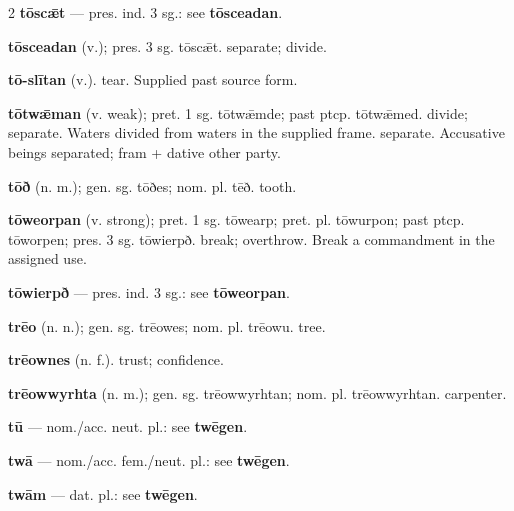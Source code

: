 \begin{multicols*}{2}
\textbf{tōscǣt} — pres. ind. 3 sg.: see \textbf{tōsceadan}.\par
\textbf{tōsceadan} (v.); pres. 3 sg. tōscǣt. separate; divide.\par
\textbf{tō-slītan} (v.). tear. Supplied past source form.\par
\textbf{tōtwǣman} (v. weak); pret. 1 sg. tōtwǣmde; past ptcp. tōtwǣmed. divide; separate. Waters divided from waters in the supplied frame. separate. Accusative beings separated; fram + dative other party.\par
\textbf{tōð} (n. m.); gen. sg. tōðes; nom. pl. tēð. tooth.\par
\textbf{tōweorpan} (v. strong); pret. 1 sg. tōwearp; pret. pl. tōwurpon; past ptcp. tōworpen; pres. 3 sg. tōwierpð. break; overthrow. Break a commandment in the assigned use.\par
\textbf{tōwierpð} — pres. ind. 3 sg.: see \textbf{tōweorpan}.\par
\textbf{trēo} (n. n.); gen. sg. trēowes; nom. pl. trēowu. tree.\par
\textbf{trēownes} (n. f.). trust; confidence.\par
\textbf{trēowwyrhta} (n. m.); gen. sg. trēowwyrhtan; nom. pl. trēowwyrhtan. carpenter.\par
\textbf{tū} — nom./acc. neut. pl.: see \textbf{twēgen}.\par
\textbf{twā} — nom./acc. fem./neut. pl.: see \textbf{twēgen}.\par
\textbf{twām} — dat. pl.: see \textbf{twēgen}.\par

\end{multicols*}
